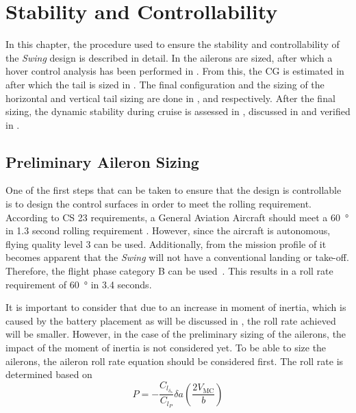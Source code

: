 \chapter{Stability and Controllability}
\label{ch:Stability_and_Control}
In this chapter, the procedure used to ensure the stability and controllability of the \textit{Swing} design is described in detail. In  the ailerons are sized, after which a hover control analysis has been performed in . From this, the CG is estimated in  after which the tail is sized in . The final configuration and the sizing of the horizontal and vertical tail sizing are done in ,  and  respectively. After the final sizing, the dynamic stability during cruise is assessed in , discussed in  and verified in .


\section{Preliminary Aileron Sizing}
\label{sec:Aileron_Sizing}
One of the first steps that can be taken to ensure that the design is controllable is to design the control surfaces in order to meet the rolling requirement.
According to CS 23 requirements, a General Aviation Aircraft should meet a \qty{60}{\degree} in 1.3 second rolling requirement \cite{easa_cs23_2020}.
However, since the aircraft is autonomous, flying quality level 3 can be used.
Additionally, from the mission profile of  it becomes apparent that the \textit{Swing} will not have a conventional landing or take-off.
Therefore, the flight phase category B can be used~\cite{roll_requirement}.
This results in a roll rate requirement of \qty{60}{\degree} in 3.4 seconds.

It is important to consider that due to an increase in moment of inertia, which is caused by the battery placement as will be discussed in , the roll rate achieved will be smaller.
However, in the case of the preliminary sizing of the ailerons, the impact of the moment of inertia is not considered yet.
To be able to size the ailerons, the aileron roll rate equation should be considered first.
The roll rate is determined based on 
\begin{equation}
    \label{eq:Aileron:Roll_rate}
    P=-\frac{C_{l_{\delta_{\text{a}}}}}{C_{l_P}} \delta a\left(\frac{2 V_\text{MC}}{b}\right)
\end{equation}

